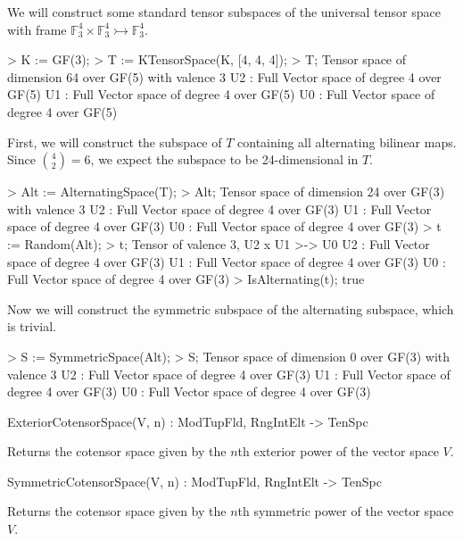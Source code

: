 \begin{example}[StandardTenSubspcs]

We will construct some standard tensor subspaces of the universal tensor space with frame $\mathbb{F}_3^4\times \mathbb{F}_3^4\rightarrowtail\mathbb{F}_3^4$.
\begin{code}
> K := GF(3);
> T := KTensorSpace(K, [4, 4, 4]);
> T;
Tensor space of dimension 64 over GF(5) with valence 3
U2 : Full Vector space of degree 4 over GF(5)
U1 : Full Vector space of degree 4 over GF(5)
U0 : Full Vector space of degree 4 over GF(5)
\end{code}

First, we will construct the subspace of $T$ containing all alternating bilinear maps.
Since $\binom{4}{2}=6$, we expect the subspace to be 24-dimensional in $T$. 
\begin{code}
> Alt := AlternatingSpace(T);
> Alt;
Tensor space of dimension 24 over GF(3) with valence 3
U2 : Full Vector space of degree 4 over GF(3)
U1 : Full Vector space of degree 4 over GF(3)
U0 : Full Vector space of degree 4 over GF(3)
> t := Random(Alt);
> t;
Tensor of valence 3, U2 x U1 >-> U0
U2 : Full Vector space of degree 4 over GF(3)
U1 : Full Vector space of degree 4 over GF(3)
U0 : Full Vector space of degree 4 over GF(3)
> IsAlternating(t);
true
\end{code}

Now we will construct the symmetric subspace of the alternating subspace, which is trivial.
\begin{code}
> S := SymmetricSpace(Alt);
> S;
Tensor space of dimension 0 over GF(3) with valence 3
U2 : Full Vector space of degree 4 over GF(3)
U1 : Full Vector space of degree 4 over GF(3)
U0 : Full Vector space of degree 4 over GF(3)
\end{code}
\end{example}

\begin{intrinsics}
ExteriorCotensorSpace(V, n) : ModTupFld, RngIntElt -> TenSpc
\end{intrinsics}

Returns the cotensor space given by the $n$th exterior power of the vector space $V$.

\begin{intrinsics}
SymmetricCotensorSpace(V, n) : ModTupFld, RngIntElt -> TenSpc
\end{intrinsics}

Returns the cotensor space given by the $n$th symmetric power of the vector space $V$.

